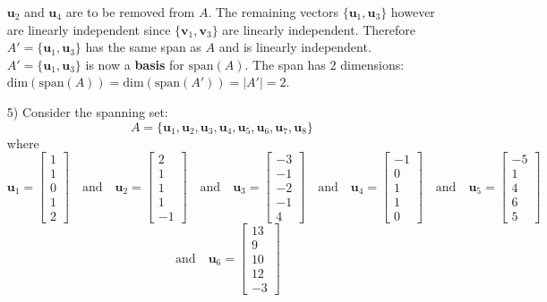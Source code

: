 \documentclass{article}
\begin{document}
\begin{itemize}
\(\mathbf{u}_2\) and \(\mathbf{u}_4\) are to be removed from \(A\). The remaining vectors \(\{\mathbf{u}_1, \mathbf{u}_3\}\) however are linearly independent since \(\{\mathbf{v}_1, \mathbf{v}_3\}\) are linearly independent. Therefore \(A' = \{\mathbf{u}_1, \mathbf{u}_3\}\) has the same span as \(A\) and is linearly independent. \(A' = \{\mathbf{u}_1, \mathbf{u}_3\}\) is now a {\bf basis} for \(\text{span}(A)\). The span has \(2\) dimensions: \(\text{dim}(\text{span}(A)) = \text{dim}(\text{span}(A')) = |A'| = 2\).
\item[5)] Consider the spanning set:
\[A = \{\mathbf{u}_1, \mathbf{u}_2, \mathbf{u}_3, \mathbf{u}_4, \mathbf{u}_5, \mathbf{u}_6, \mathbf{u}_7, \mathbf{u}_8\}\]
where
\[\mathbf{u}_1 = \begin{bmatrix}
1 \\ 1 \\ 0 \\ 1 \\ 2  
\end{bmatrix} \quad\text{and}\quad \mathbf{u}_2 =\begin{bmatrix} 
2 \\ 1 \\ 1 \\ 1 \\ -1 
\end{bmatrix} \quad\text{and}\quad \mathbf{u}_3 = \begin{bmatrix} 
-3 \\ -1 \\ -2 \\ -1 \\ 4
\end{bmatrix} \quad\text{and}\quad \mathbf{u}_4 = \begin{bmatrix} 
-1 \\ 0 \\ 1 \\ 1 \\ 0 
\end{bmatrix} \quad\text{and}\quad \mathbf{u}_5 = \begin{bmatrix} 
-5 \\ 1 \\ 4 \\ 6 \\ 5 
\end{bmatrix}\] \[\quad\text{and}\quad \mathbf{u}_6 = \begin{bmatrix} 
13 \\ 9 \\ 10 \\ 12 \\ -3 

\end{bmatrix}\]
\end{itemize}
\end{document}
